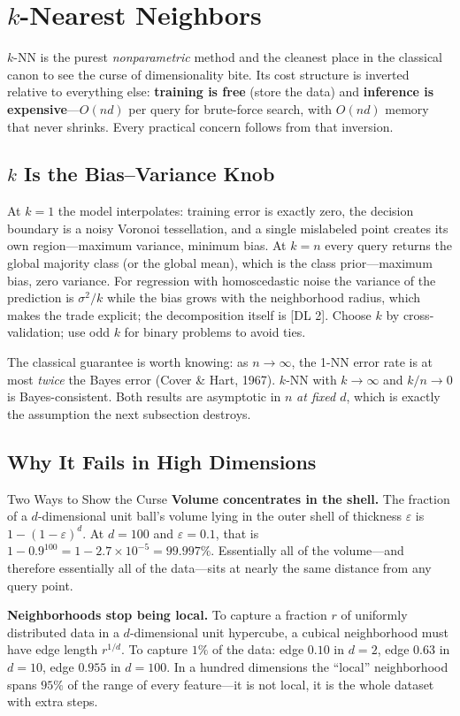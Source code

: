 \section{$k$-Nearest Neighbors}
\label{cml:sec:knn}

$k$-NN is the purest \emph{nonparametric} method and the cleanest place in the classical canon to see the curse of dimensionality bite. Its cost structure is inverted relative to everything else: \textbf{training is free} (store the data) and \textbf{inference is expensive}---$O(nd)$ per query for brute-force search, with $O(nd)$ memory that never shrinks. Every practical concern follows from that inversion.

\subsection{$k$ Is the Bias--Variance Knob}

At $k=1$ the model interpolates: training error is exactly zero, the decision boundary is a noisy Voronoi tessellation, and a single mislabeled point creates its own region---maximum variance, minimum bias. At $k=n$ every query returns the global majority class (or the global mean), which is the class prior---maximum bias, zero variance. For regression with homoscedastic noise the variance of the prediction is $\sigma^2/k$ while the bias grows with the neighborhood radius, which makes the trade explicit; the decomposition itself is [DL 2]. Choose $k$ by cross-validation; use odd $k$ for binary problems to avoid ties.

The classical guarantee is worth knowing: as $n\to\infty$, the 1-NN error rate is at most \emph{twice} the Bayes error (Cover \& Hart, 1967). $k$-NN with $k\to\infty$ and $k/n\to 0$ is Bayes-consistent. Both results are asymptotic in $n$ \emph{at fixed $d$}, which is exactly the assumption the next subsection destroys.

\subsection{Why It Fails in High Dimensions}

\begin{mathresult}{Two Ways to Show the Curse}
\textbf{Volume concentrates in the shell.} The fraction of a $d$-dimensional unit ball's volume lying in the outer shell of thickness $\varepsilon$ is $1 - (1-\varepsilon)^d$. At $d = 100$ and $\varepsilon = 0.1$, that is $1 - 0.9^{100} = 1 - 2.7\times10^{-5} = 99.997\%$. Essentially all of the volume---and therefore essentially all of the data---sits at nearly the same distance from any query point.

\textbf{Neighborhoods stop being local.} To capture a fraction $r$ of uniformly distributed data in a $d$-dimensional unit hypercube, a cubical neighborhood must have edge length $r^{1/d}$. To capture $1\%$ of the data: edge $0.10$ in $d=2$, edge $0.63$ in $d=10$, edge $\mathbf{0.955}$ in $d=100$. In a hundred dimensions the ``local'' neighborhood spans $95\%$ of the range of every feature---it is not local, it is the whole dataset with extra steps.
\end{mathresult}

